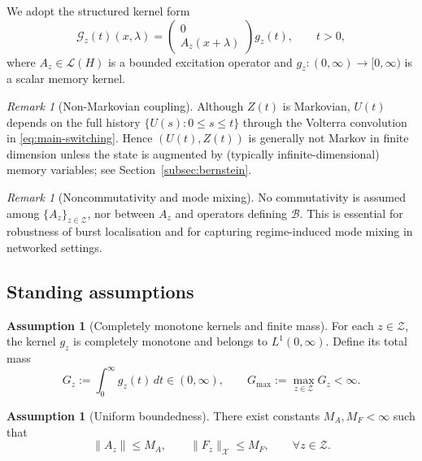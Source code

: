 \documentclass[12pt,a4paper]{article}
\theoremstyle{plain}
\theoremstyle{definition}
\newtheorem{assumption}[theorem]{Assumption}
\theoremstyle{remark}
\newtheorem{remark}[theorem]{Remark}
\begin{document}
We adopt the structured kernel form
\begin{equation}
	\label{eq:Gz-structure}
	\mathcal G_{z}(t)(x,\lambda)
	=
	\begin{pmatrix}
		0\\ A_z(x+\lambda)
	\end{pmatrix} g_z(t),
	\qquad t>0,
\end{equation}
where $A_z\in\mathcal L(H)$ is a bounded excitation operator and
$g_z:(0,\infty)\to[0,\infty)$ is a scalar memory kernel.

\begin{remark}[Non-Markovian coupling]
	\label{rem:nonmarkov}
	Although $Z(t)$ is Markovian, $U(t)$ depends on the full history
	$\{U(s):0\le s\le t\}$ through the Volterra convolution in \eqref{eq:main-switching}.
	Hence $(U(t),Z(t))$ is generally not Markov in finite dimension unless the state is
	augmented by (typically infinite-dimensional) memory variables; see
	Section~\ref{subsec:bernstein}.
\end{remark}

\begin{remark}[Noncommutativity and mode mixing]
	\label{rem:noncomm}
	No commutativity is assumed among $\{A_z\}_{z\in\mathcal Z}$, nor between $A_z$ and
	operators defining $\mathcal B$. This is essential for robustness of burst localisation
	and for capturing regime-induced mode mixing in networked settings.
\end{remark}

\subsection{Standing assumptions}
\label{subsec:assumptions}

\begin{assumption}[Completely monotone kernels and finite mass]
	\label{ass:kernels}
	For each $z\in\mathcal Z$, the kernel $g_z$ is completely monotone and belongs to
	$L^1(0,\infty)$. Define its total mass
	\begin{equation}
		\label{eq:kernel-mass}
		G_z := \int_{0}^{\infty} g_z(t)\,dt \in (0,\infty),
		\qquad
		G_{\max}:=\max_{z\in\mathcal Z}G_z<\infty.
	\end{equation}
\end{assumption}

\begin{assumption}[Uniform boundedness]
	\label{ass:uniform}
	There exist constants $M_A,M_F<\infty$ such that
	\begin{equation}
		\label{eq:uniform-bounds}
		\|A_z\|\le M_A,
		\qquad
		\|F_z\|_{\mathcal X}\le M_F,
		\qquad
		\forall z\in\mathcal Z.
	\end{equation}
\end{assumption}
\end{document}
